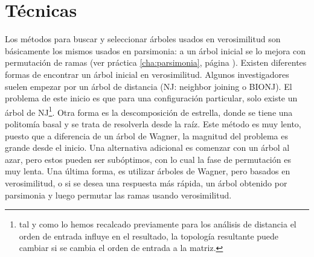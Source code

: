\section*{T\'ecnicas}
Los m\'etodos para buscar y seleccionar \'arboles usados en verosimilitud son b\'asicamente los mismos usados en parsimonia: a un \'arbol inicial se lo mejora con permutaci\'on de ramas (ver pr\'actica \ref{cha:parsimonia}, p\'agina \pageref{cha:parsimonia}). Existen diferentes formas de encontrar un \'arbol inicial en verosimilitud. Algunos investigadores suelen empezar por un \'arbol de distancia (NJ: neighbor joining o BIONJ). El problema de este inicio es que para una configuraci\'on particular, solo existe un \'arbol de NJ\footnote{tal y como lo hemos recalcado previamente para los an\'alisis de distancia el orden de entrada influye en el resultado, la topolog\'ia resultante puede cambiar si se cambia el orden de entrada a la matriz.}. Otra forma es la descomposici\'on de estrella, donde se tiene una politom\'ia basal y se trata de resolverla desde la ra\'iz. Este m\'etodo es muy lento, puesto que a diferencia de un \'arbol de Wagner, la magnitud del problema es grande desde el inicio. Una alternativa adicional es comenzar con un \'arbol al azar, pero estos pueden ser sub\'optimos, con lo cual la fase de permutaci\'on es muy lenta. Una \'ultima forma, es utilizar \'arboles de Wagner, pero basados en verosimilitud, o si se desea una respuesta m\'as r\'apida, un \'arbol obtenido por parsimonia y luego permutar las ramas usando verosimilitud.

